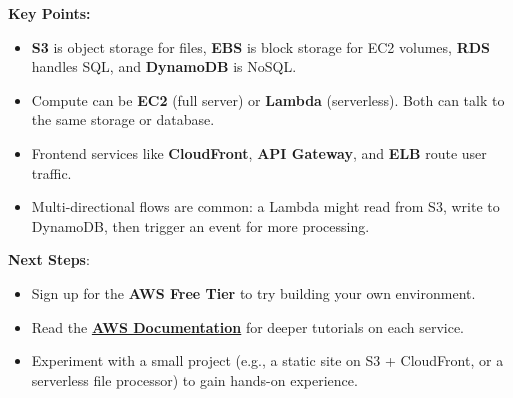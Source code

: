 \documentclass[12pt]{article}
\begin{document}
\textbf{Key Points:}
\begin{itemize}
    \item \textbf{S3} is object storage for files, \textbf{EBS} is block storage for EC2 volumes, \textbf{RDS} handles SQL, and \textbf{DynamoDB} is NoSQL.
    \item Compute can be \textbf{EC2} (full server) or \textbf{Lambda} (serverless). Both can talk to the same storage or database.
    \item Frontend services like \textbf{CloudFront}, \textbf{API Gateway}, and \textbf{ELB} route user traffic.
    \item Multi-directional flows are common: a Lambda might read from S3, write to DynamoDB, then trigger an event for more processing.
\end{itemize}

\noindent
\textbf{Next Steps}:
\begin{itemize}
    \item Sign up for the \textbf{AWS Free Tier} to try building your own environment.
    \item Read the \href{https://docs.aws.amazon.com}{\textbf{AWS Documentation}} for deeper tutorials on each service.
    \item Experiment with a small project (e.g., a static site on S3 + CloudFront, or a serverless file processor) to gain hands-on experience.
\end{itemize}
\end{document}
